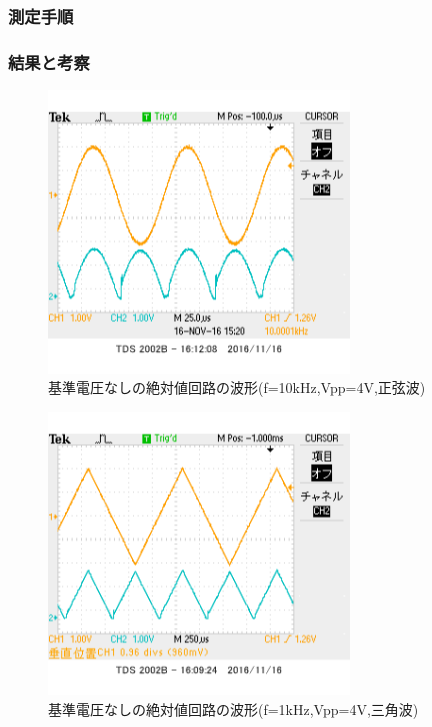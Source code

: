 \documentclass[11pt,a4j]{jsarticle}
\begin{document}
   \subsubsection{測定手順}
    
    
   \subsubsection{結果と考察}
    
    \begin{figure}[htbp]
  \centering
  \includegraphics[width=8cm,clip]{2_abs_Vr0_f10V4sin_ViVo.png}
  \caption{基準電圧なしの絶対値回路の波形(f=10kHz,Vpp=4V,正弦波)}
  \label{fig:2_Vr0_sin}
 \end{figure}%
    
    
    \begin{figure}[htbp]
  \centering
  \includegraphics[width=8cm,clip]{2_abs_Vr0_f1V4sankaku_ViVo.png}
  \caption{基準電圧なしの絶対値回路の波形(f=1kHz,Vpp=4V,三角波)}
  \label{fig:2_Vr0_sankaku}
 \end{figure}%
  
\end{document}

